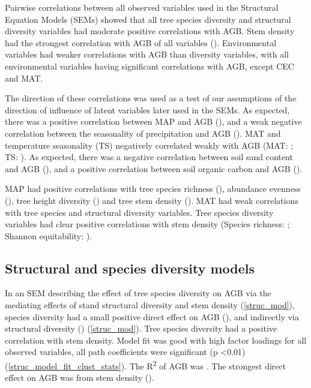 \documentclass[11pt,a4paper]{article}
\begin{document}
Pairwise correlations between all observed variables used in the Structural Equation Models (SEMs) showed that all tree species diversity and structural diversity variables had moderate positive correlations with AGB. Stem density had the strongest correlation with AGB of all variables (\ccib{}). Environmental variables had weaker correlations with AGB than diversity variables, with all environmental variables having significant correlations with AGB, except CEC and MAT.

The direction of these correlations was used as a test of our assumptions of the direction of influence of latent variables later used in the SEMs. As expected, there was a positive correlation between MAP and AGB (\ccmb{}), and a weak negative correlation between the seasonality of precipitation and AGB (\ccmcb{}). MAT and temperature seasonality (TS) negatively correlated weakly with AGB (MAT: \cctb{}; TS: \cctcb{}). As expected, there was a negative correlation between soil sand content and AGB (\ccsb{}), and a positive correlation between soil organic carbon and AGB (\ccob{}). 

MAP had positive correlations with tree species richness (\ccms{}), abundance evenness (\ccme{}), tree height diversity (\ccmh{}) and tree stem density (\ccmi{}). MAT had weak correlations with tree species and structural diversity variables. Tree species diversity variables had clear positive correlations with stem density (Species richness: \ccsi{}; Shannon equitability: \ccei{}). 

\subsection*{Structural and species diversity models}

In an SEM describing the effect of tree species diversity on AGB via the mediating effects of stand structural diversity and stem density (\autoref{struc_mod}), species diversity had a small positive direct effect on AGB (\strucdb{}), and indirectly via structural diversity (\strucdsb{}) (\autoref{struc_mod}). Tree species diversity had a positive correlation with stem density. Model fit was good with high factor loadings for all observed variables, all path coefficients were significant (p <0.01) (\autoref{struc_model_fit_clust_stats}). The R\textsuperscript{2} of AGB was \strucrsq{}. The strongest direct effect on AGB was from stem density (\strucsib{}).
\end{document}
